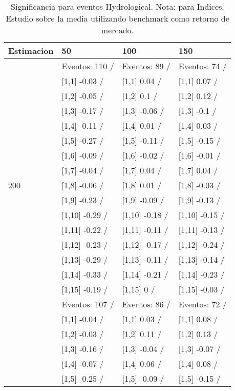 \begin{table}

\caption{Significancia para eventos Hydrological. Nota: para Indices. Estudio sobre la media utilizando benchmark como retorno de mercado.}
\centering
\begin{tabular}[t]{llll}
\toprule
Estimacion & 50 & 100 & 150\\
\midrule
 & Eventos:  110 / & Eventos:  89 / & Eventos:  74 /\\
 & {}[1,1] -0.03  / & {}[1,1] 0.04  / & {}[1,1] 0.07  /\\
 & {}[1,2] -0.05  / & {}[1,2] 0.1  / & {}[1,2] 0.12  /\\
 & {}[1,3] -0.17  / & {}[1,3] -0.06  / & {}[1,3] -0.1  /\\
 & {}[1,4] -0.11  / & {}[1,4] 0.01  / & {}[1,4] 0.03  /\\
\addlinespace
 & {}[1,5] -0.27  / & {}[1,5] -0.11  / & {}[1,5] -0.15  /\\
 & {}[1,6] -0.09  / & {}[1,6] -0.02  / & {}[1,6] -0.01  /\\
 & {}[1,7] -0.04  / & {}[1,7] 0.04  / & {}[1,7] 0.04  /\\
200 & {}[1,8] -0.06  / & {}[1,8] 0.01  / & {}[1,8] -0.03  /\\
 & {}[1,9] -0.23  / & {}[1,9] -0.09  / & {}[1,9] -0.13  /\\
\addlinespace
 & {}[1,10] -0.29  / & {}[1,10] -0.18  / & {}[1,10] -0.15  /\\
 & {}[1,11] -0.22  / & {}[1,11] -0.11  / & {}[1,11] -0.13  /\\
 & {}[1,12] -0.23  / & {}[1,12] -0.17  / & {}[1,12] -0.24  /\\
 & {}[1,13] -0.29  / & {}[1,13] -0.11  / & {}[1,13] -0.14  /\\
 & {}[1,14] -0.33  / & {}[1,14] -0.21  / & {}[1,14] -0.23  /\\
\addlinespace
 & {}[1,15] -0.19  / & {}[1,15] 0  / & {}[1,15] -0.03  /\\
 & Eventos:  107 / & Eventos:  86 / & Eventos:  72 /\\
 & {}[1,1] -0.04  / & {}[1,1] 0.03  / & {}[1,1] 0.08  /\\
 & {}[1,2] -0.03  / & {}[1,2] 0.11  / & {}[1,2] 0.13  /\\
 & {}[1,3] -0.16  / & {}[1,3] -0.04  / & {}[1,3] -0.07  /\\
\addlinespace
 & {}[1,4] -0.07  / & {}[1,4] 0.06  / & {}[1,4] 0.08  /\\
 & {}[1,5] -0.25  / & {}[1,5] -0.09  / & {}[1,5] -0.15  /\\

\end{tabular}
\end{table}
